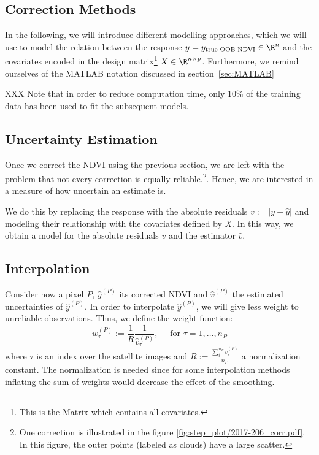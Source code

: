 {    \subsection{Correction Methods}{
        \label{sec:corr_methods}
        In the following, we will introduce different modelling approaches, which we will use to model the relation between the response $y = y_{\text{true OOB NDVI}}\in \R^n$ and the covariates encoded in the design matrix\footnote{This is the Matrix which contains all covariates.} $X\in\R^{n \times p}$. 
        Furthermore, we remind ourselves of the MATLAB notation discussed in section~\ref{sec:MATLAB}

        XXX Note that in order to reduce computation time, only $10\%$ of the training data has been used to fit the subsequent models.

        
    }
    
    \subsection{Uncertainty Estimation}{
        \label{sec:corr_uncertainty}
        Once we correct the NDVI using the previous section, we are left with the problem that not every correction is equally reliable.\footnote{One correction is illustrated in the figure \ref{fig:step_plot/2017-206_corr.pdf}. In this figure, the outer points (labeled as clouds) have a large scatter.}. Hence, we are interested in a measure of how uncertain an estimate is. 

        We do this by replacing the response with the absolute residuals $v := \left|y -\hat y\right|$ and modeling their relationship with the covariates defined by $X$.  In this way, we obtain a model for the absolute residuals $v$ and the estimator $\hat v$.  
    }

    \subsection{Interpolation}{
        \label{sec:corr_link}
        Consider now a pixel $P$, $\hat y^{(P)}$ its corrected NDVI and $\hat v^{(P)}$ the estimated uncertainties of $\hat y^{(P)}$. In order to interpolate $\hat y^{(P)}$, we will give less weight to unreliable observations. Thus, we define the weight function: 
        \begin{equation}
            \label{eq:corr_link}
            w^{(P)}_\tau:=\frac{1}{R} \frac{1}{\hat v^{(P)}_\tau}, 
            \quad \text{ for } \tau=1,\dots, n_P
        \end{equation}  
        where $\tau$ is an index over the satellite images and $R:=\frac{\sum_i^{n_P}\hat v^{(P)}_i}{n_P}$ a normalization constant. The normalization is needed since for some interpolation methods inflating the sum of weights would decrease the effect of the smoothing. 
    }
}

